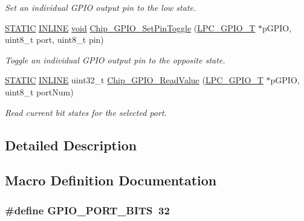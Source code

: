 \begin{DoxyCompactItemize}
\begin{DoxyCompactList}\small\item\em Set an individual G\-P\-I\-O output pin to the low state. \end{DoxyCompactList}\item 
\hyperlink{group__LPC__Types__Public__Macros_ga10b2d890d871e1489bb02b7e70d9bdfb}{S\-T\-A\-T\-I\-C} \hyperlink{group__LPC__Types__Public__Types_ga2eb6f9e0395b47b8d5e3eeae4fe0c116}{I\-N\-L\-I\-N\-E} \hyperlink{Paradigm_2Tern__EE_2small_2portmacro_8h_a14d32f8130d3c0b212cfc751730b5b49}{void} \hyperlink{group__GPIO__17XX__40XX_ga5437e5a8ae2ce7662b605f9961aad8f5}{Chip\-\_\-\-G\-P\-I\-O\-\_\-\-Set\-Pin\-Toggle} (\hyperlink{structLPC__GPIO__T}{L\-P\-C\-\_\-\-G\-P\-I\-O\-\_\-\-T} $\ast$p\-G\-P\-I\-O, uint8\-\_\-t port, uint8\-\_\-t pin)
\begin{DoxyCompactList}\small\item\em Toggle an individual G\-P\-I\-O output pin to the opposite state. \end{DoxyCompactList}\item 
\hyperlink{group__LPC__Types__Public__Macros_ga10b2d890d871e1489bb02b7e70d9bdfb}{S\-T\-A\-T\-I\-C} \hyperlink{group__LPC__Types__Public__Types_ga2eb6f9e0395b47b8d5e3eeae4fe0c116}{I\-N\-L\-I\-N\-E} uint32\-\_\-t \hyperlink{group__GPIO__17XX__40XX_gaadfa7274313165ae6dec004a125a1bcf}{Chip\-\_\-\-G\-P\-I\-O\-\_\-\-Read\-Value} (\hyperlink{structLPC__GPIO__T}{L\-P\-C\-\_\-\-G\-P\-I\-O\-\_\-\-T} $\ast$p\-G\-P\-I\-O, uint8\-\_\-t port\-Num)
\begin{DoxyCompactList}\small\item\em Read current bit states for the selected port. \end{DoxyCompactList}\end{DoxyCompactItemize}


\subsection{Detailed Description}


\subsection{Macro Definition Documentation}
\hypertarget{group__GPIO__17XX__40XX_gab4525a5821aedad3e12d4fcdfb760c69}{
\subsubsection[{G\-P\-I\-O\-\_\-\-P\-O\-R\-T\-\_\-\-B\-I\-T\-S}]{\setlength{\rightskip}{0pt plus 5cm}\#define G\-P\-I\-O\-\_\-\-P\-O\-R\-T\-\_\-\-B\-I\-T\-S~32}}\label{group__GPIO__17XX__40XX_gab4525a5821aedad3e12d4fcdfb760c69}


